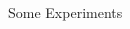 \documentclass{beamer}
\begin{document}
\begin{frame}{Some Experiments}
     {
        
    }
     {
        \begin{columns}
            \begin{column}{0.45\textwidth}
                
            \end{column}
            \begin{column}{0.45\textwidth}
            \end{column}
        \end{columns}
    }

     {
        
    }
     {
        \begin{columns}
            \begin{column}{0.45\textwidth}
                
            \end{column}
            \begin{column}{0.45\textwidth}
            \end{column}
        \end{columns}
    }

     {
        
    }
     {
        \begin{columns}
            \begin{column}{0.45\textwidth}
                
            \end{column}
            \begin{column}{0.45\textwidth}
            \end{column}
        \end{columns}
    }


\end{frame}
\end{document}
